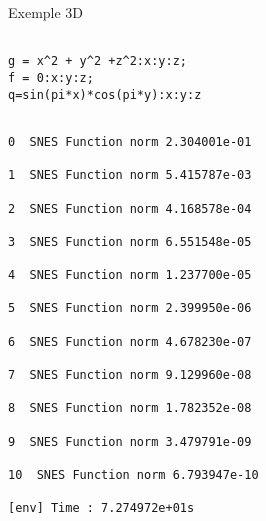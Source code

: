 \documentclass[11pt]{beamer}
\begin{document}
\begin{frame}{Exemple 3D}

\begin{verbatim}

g = x^2 + y^2 +z^2:x:y:z; 
f = 0:x:y:z; 
q=sin(pi*x)*cos(pi*y):x:y:z
\end{verbatim}


\begin{verbatim}

0  SNES Function norm 2.304001e-01

1  SNES Function norm 5.415787e-03

2  SNES Function norm 4.168578e-04

3  SNES Function norm 6.551548e-05

4  SNES Function norm 1.237700e-05

5  SNES Function norm 2.399950e-06

6  SNES Function norm 4.678230e-07

7  SNES Function norm 9.129960e-08

8  SNES Function norm 1.782352e-08

9  SNES Function norm 3.479791e-09

10  SNES Function norm 6.793947e-10

[env] Time : 7.274972e+01s
\end{verbatim}

\end{frame}


\end{document}
